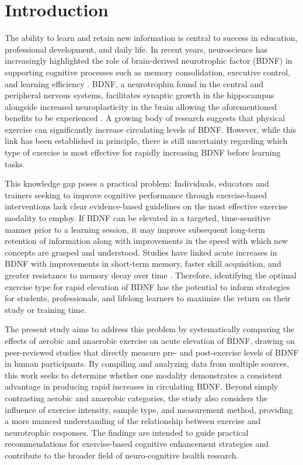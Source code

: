 \documentclass[runningheads]{llncs}
\begin{document}
%
%
%
\section{Introduction}
The ability to learn and retain new information is central to success in education, professional development, and daily life. In recent years, neuroscience has increasingly highlighted the role of brain-derived neurotrophic factor (BDNF) in supporting cognitive processes such as memory consolidation, executive control, and learning efficiency \cite{vivar2017running}. BDNF, a neurotrophin found in the central and peripheral nervous systems, facilitates synaptic growth in the hippocampus alongside increased neuroplasticity in the brain allowing the aforementioned benefits to be experienced \cite{vivar2017running}. A growing body of research suggests that physical exercise can significantly increase circulating levels of BDNF. However, while this link has been established in principle, there is still uncertainty regarding which type of exercise is most effective for rapidly increasing BDNF before learning tasks.

This knowledge gap poses a practical problem: Individuals, educators and trainers seeking to improve cognitive performance through exercise-based interventions lack clear evidence-based guidelines on the most effective exercise modality to employ. If BDNF can be elevated in a targeted, time-sensitive manner prior to a learning session, it may improve subsequent long-term retention of information along with improvements in the speed with which new concepts are grasped and understood. Studies have linked acute increases in BDNF with improvements in short-term memory, faster skill acquisition, and greater resistance to memory decay over time \cite{winter2007high}. Therefore, identifying the optimal exercise type for rapid elevation of BDNF has the potential to inform strategies for students, professionals, and lifelong learners to maximize the return on their study or training time. 

The present study aims to address this problem by systematically comparing the effects of aerobic and anaerobic exercise on acute elevation of BDNF, drawing on peer-reviewed studies that directly measure pre- and post-exercise levels of BDNF in human participants. By compiling and analyzing data from multiple sources, this work seeks to determine whether one modality demonstrates a consistent advantage in producing rapid increases in circulating BDNF. Beyond simply contrasting aerobic and anaerobic categories, the study also considers the influence of exercise intensity, sample type, and measurement method, providing a more nuanced understanding of the relationship between exercise and neurotrophic responses. The findings are intended to guide practical recommendations for exercise-based cognitive enhancement strategies and contribute to the broader field of neuro-cognitive health research.
\end{document}

